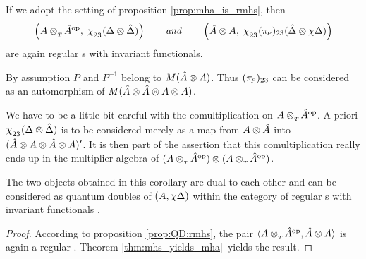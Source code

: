 \begin{cor}
If we adopt the setting of proposition \ref{prop:mha_is_rmhs}, then
$$ \left( A \ttens{T} \hat{A}\op, \;
       \flipsub{23} (\Delta \tens \hat{\Delta}) \right)
\itandspace{2em}
   \left( \hat{A} \tens A, \;
       \flipsub{23} (\piP)_{23} (\hat{\Delta} \tens \flip\Delta) \right)$$
are again regular \mha s with invariant functionals.
\end{cor}



\begin{remarks}
\item
By assumption $P$ and $P^{-1}$ belong to $M(\hat{A} \tens A)$.
Thus $(\piP)_{23}$ can be considered as an automorphism of
$M(\hat{A} \tens \hat{A} \tens A \tens A)$.
\item
We have to be a little bit careful with the comultiplication on $A \ttens{T} \hat{A}\op$.
A priori $\flipsub{23} (\Delta \tens \hat{\Delta})$ is to be considered
merely as a map from $A \tens \hat{A}\vertL$ into
$\vertL (\hat{A} \tens A \tens \hat{A} \tens A)'$.
It is then part of the assertion that this comultiplication
really ends up in the multiplier algebra of
$(A \ttens{T} \hat{A}\op)  \tens  (A \ttens{T} \hat{A}\op)$.
\item
The two objects obtained in this corollary are dual to each other and
can be considered as quantum doubles of $(A, \flip\Delta)$
within the category of regular \mha s with invariant functionals
\cite{FonsDra:QD}\@.
\end{remarks}



\begin{proof}
According to proposition \ref{prop:QD:rmhs}, the pair
$\pair{A \ttens{T} \hat{A}\op}{\hat{A} \tens A}$
is again a regular \mhs\@.
Theorem \ref{thm:mhs_yields_mha}\ yields the result.
\end{proof}
